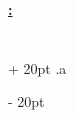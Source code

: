 \documentclass[a4paper, 12pt, twoside]{article}
\newcommand{\Emph}{\textcolor{ff4500}}
\newcommand{\ind}[1][20pt]{\advance\leftskip + #1}
\newcommand{\deind}[1][20pt]{\advance\leftskip - #1}
\newenvironment{indt}[2][20pt]{#2 \par \ind[#1]}{\par \deind} %
\newcommand{\thetitle}[2]{\begin{center}\textbf{{\LARGE \underline{\Emph{#1} :}} {\Large #2}}\end{center}}
\begin{document}
    
    \thetitle{}{}
    
    
    \begin{indt}{\section{}}
        .a
    \end{indt}
    
\end{document}
